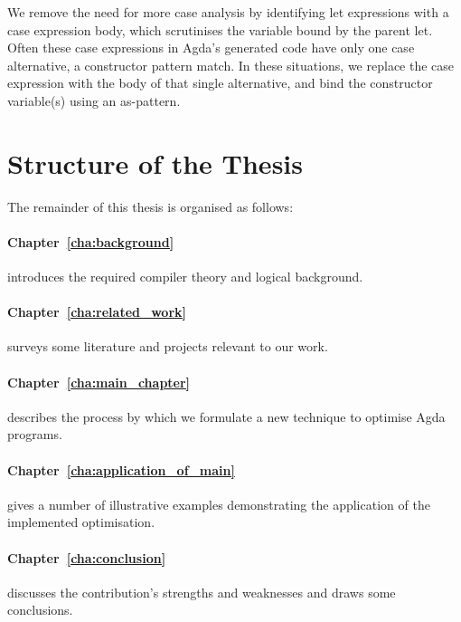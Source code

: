 We remove the need for more case analysis by identifying let expressions with a case expression body, which scrutinises the variable bound by the parent let. Often these case expressions in Agda's generated code have only one case alternative, a constructor pattern match. In these situations, we replace the case expression with the body of that single alternative, and bind the constructor variable(s) using an as-pattern.


\section{Structure of the Thesis}
\label{sec:structure_of_the_thesis}

The remainder of this thesis is organised as follows:

\paragraph{Chapter~\ref{cha:background}} introduces the required compiler theory and logical background.

\paragraph{Chapter~\ref{cha:related_work}} surveys some literature and projects relevant to our work.

\paragraph{Chapter~\ref{cha:main_chapter}} describes the process by which we formulate a new technique to optimise Agda programs.

\paragraph{Chapter~\ref{cha:application_of_main}} gives a number of illustrative examples demonstrating the application of the implemented optimisation.

\paragraph{Chapter~\ref{cha:conclusion}} discusses the contribution's strengths and weaknesses and draws some conclusions.
